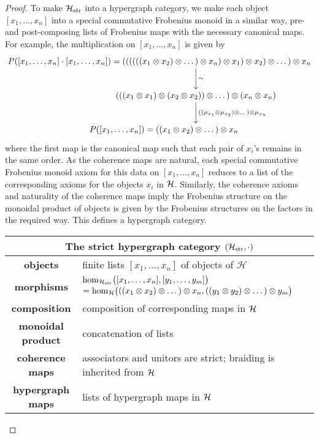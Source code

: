 \begin{proof}
  To make $\mathcal H_{\mathrm{str}}$ into a hypergraph category, we make each
  object $[x_1,\dots,x_n]$ into a special commutative Frobenius monoid in a
  similar way, pre- and post-composing lists of Frobenius maps with the
  necessary canonical maps. For example, the multiplication on $[x_1,\dots,x_n]$
  is given by 
  \[
    \xymatrixcolsep{-4pt}
    \xymatrix{
      P([x_1,\dots,x_n]\cdot[x_1,&\dots,x_n])=
      ((((((x_1 \ot x_2) \ot \dots) \ot x_n) \ot x_1) \ot x_2) \ot \dots) \ot
      x_n \ar[d]^{\sim} \\
      &(((x_1 \ot x_1) \ot (x_2 \ot x_2)) \ot \dots) \ot (x_n \ot x_n)
      \ar[d]^{((\mu_{x_1} \ot \mu_{x_2}) \ot \dots ) \ot \mu_{x_n}} \\
      &P([x_1,\dots,x_n])=((x_1 \ot x_2) \ot \dots ) \ot x_n 
      \phantom{P([x_1,\dots,x_n])=}
    }
  \]
  where the first map is the canonical map such that each pair of $x_i$'s
  remains in the same order. As the coherence maps are natural, each
  special commutative Frobenius monoid axiom for this data on $[x_1,\dots,x_n]$
  reduces to a list of the corresponding axioms for the objects $x_i$ in $\mathcal H$.
  Similarly, the coherence axioms and naturality of the coherence maps imply the
  Frobenius structure on the monoidal product of objects is given by the
  Frobenius structures on the factors in the required way. This defines a hypergraph category.
  \smallskip

  \begin{center}
    \begin{tabular}{| c | p{} |}
      \hline
      \multicolumn{2}{|c|}{The strict hypergraph category $(\mathcal H_{\mathrm{str}},
      \cdot)$} \\
      \hline
      \textbf{objects} & finite lists $[x_1, \dots, x_n]$ of objects of
      $\mathcal H$ \\ 
      \textbf{morphisms} & $\mathrm{hom}_{\mathcal H_{\mathrm{str}}}\big([x_1, \dots,
      x_n],[y_1, \dots, y_m]\big)$ \newline $= \mathrm{hom}_{\mathcal H}\big(((x_1 \otimes x_2) \otimes
      \dots) \otimes x_n, ((y_1 \otimes y_2) \otimes \dots) \otimes y_m\big)$\\ 
      \textbf{composition} & composition of corresponding maps in $\mathcal H$ \\
      \textbf{monoidal product} & concatenation of lists \\
      \textbf{coherence maps} & associators and unitors are strict; braiding is
      inherited from $\mathcal H$  \\
      \textbf{hypergraph maps} & lists of hypergraph maps in $\mathcal H$ \\
      \hline
    \end{tabular}
  \end{center}
  \smallskip


\end{proof}
